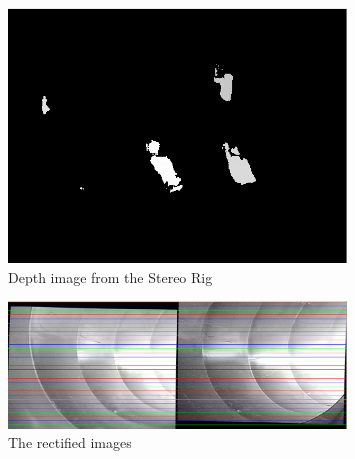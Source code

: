 \begin{figure}[htbp]
    \centering
    \includegraphics[width=0.8\textwidth]{pics/pos21-control-depth}
    \caption{Depth image from the Stereo Rig}
    \label{chap7:fig-pos21-control-depth}
\end{figure}
\begin{figure}[htbp]
    \centering
    \includegraphics[width=0.8\textwidth]{pics/pos21-control-rectified}
    \caption{The rectified images}
    \label{chap7:fig-pos21-control-rectified}
\end{figure}




